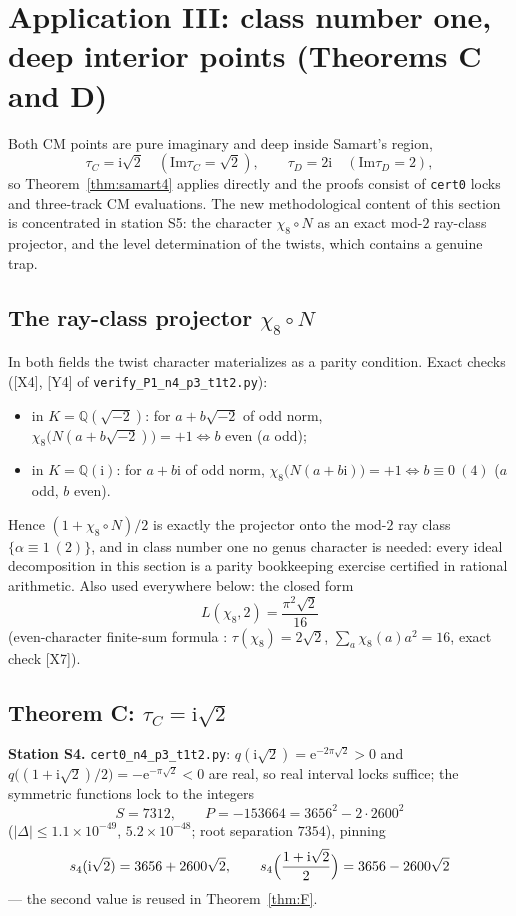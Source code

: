 \documentclass[11pt]{article}
\newcommand{\Qq}{\mathbb{Q}}
\newcommand{\ii}{\mathrm{i}}
\newcommand{\e}{\mathrm{e}}
\newcommand{\ImT}{\mathrm{Im}}
\theoremstyle{definition}
\theoremstyle{remark}
\begin{document}
\section{Application III: class number one, deep interior points
(Theorems C and D)}\label{sec:app3}

Both CM points are pure imaginary and deep inside Samart's region,
\[
  \tau_C=\ii\sqrt2\quad(\ImT\tau_C=\sqrt2),\qquad
  \tau_D=2\ii\quad(\ImT\tau_D=2),
\]
so Theorem~\ref{thm:samart4} applies directly and the proofs consist
of \texttt{cert0} locks and three-track CM evaluations. The new
methodological content of this section is concentrated in station S5:
the character $\chi_8\circ N$ as an exact mod-$2$ ray-class projector,
and the level determination of the twists, which contains a genuine
trap.

\subsection{The ray-class projector \texorpdfstring{$\chi_8\circ N$}{chi8 o N}}
\label{subsec:rayproj}

In both fields the twist character materializes as a parity condition.
Exact checks ([X4], [Y4] of \texttt{verify\_P1\_n4\_p3\_t1t2.py}):
\begin{itemize}
\item in $K=\Qq(\sqrt{-2})$: for $a+b\sqrt{-2}$ of odd norm,
  $\chi_8\bigl(N(a+b\sqrt{-2})\bigr)=+1\iff b$ even ($a$ odd);
\item in $K=\Qq(\ii)$: for $a+b\ii$ of odd norm,
  $\chi_8\bigl(N(a+b\ii)\bigr)=+1\iff b\equiv0\ (4)$ ($a$ odd,
  $b$ even).
\end{itemize}
Hence $(1+\chi_8\circ N)/2$ is exactly the projector onto the mod-$2$
ray class $\{\alpha\equiv1\ (2)\}$, and in class number one no genus
character is needed: every ideal decomposition in this section is a
parity bookkeeping exercise certified in rational arithmetic. Also
used everywhere below: the closed form
\[
  L(\chi_8,2)=\frac{\pi^2\sqrt2}{16}
\]
(even-character finite-sum formula \cite{Wa}: $\tau(\chi_8)=2\sqrt2$,
$\sum_a\chi_8(a)a^2=16$, exact check [X7]).

\subsection{Theorem C: \texorpdfstring{$\tau_C=\ii\sqrt2$}{tauC}}
\label{subsec:app3C}

\textbf{Station S4.} \texttt{cert0\_n4\_p3\_t1t2.py}:
$q(\ii\sqrt2)=\e^{-2\pi\sqrt2}>0$ and
$q\bigl((1+\ii\sqrt2)/2\bigr)=-\e^{-\pi\sqrt2}<0$ are real, so real
interval locks suffice; the symmetric functions lock to the integers
\[
  S=7312,\qquad P=-153664=3656^2-2\cdot2600^2
\]
($|\Delta|\le1.1\times10^{-49}$, $5.2\times10^{-48}$; root separation
$7354$), pinning
\[
  s_4(\ii\sqrt2)=3656+2600\sqrt2,\qquad
  s_4\Bigl(\frac{1+\ii\sqrt2}2\Bigr)=3656-2600\sqrt2
\]
--- the second value is reused in Theorem~\ref{thm:F}.
\end{document}
